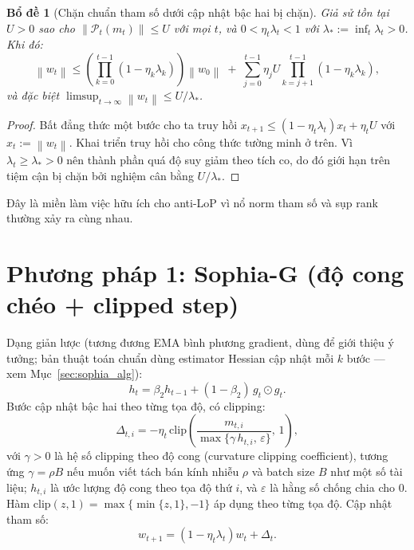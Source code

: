 \documentclass[11pt]{article}
\newcommand{\norm}[1]{\left\lVert #1 \right\rVert}
\newtheorem{lemma}{Bổ đề}[section]
\begin{document}
\begin{lemma}[Chặn chuẩn tham số dưới cập nhật bậc hai bị chặn]
Giả sử tồn tại $U>0$ sao cho $\norm{\mathcal{P}_t(m_t)}\le U$ với mọi $t$, và
$0<\eta_t\lambda_t<1$ với $\lambda_*:=\inf_t \lambda_t>0$. Khi đó:
\begin{equation}
\norm{w_t}
\le
\left(\prod_{k=0}^{t-1}(1-\eta_k\lambda_k)\right)\norm{w_0}
\;+\;
\sum_{j=0}^{t-1}\eta_j U\prod_{k=j+1}^{t-1}(1-\eta_k\lambda_k),
\end{equation}
và đặc biệt $\limsup_{t\to\infty}\norm{w_t}\le U/\lambda_*$.
\end{lemma}

\begin{proof}
Bất đẳng thức một bước cho ta truy hồi
$x_{t+1}\le (1-\eta_t\lambda_t)x_t+\eta_tU$ với $x_t:=\norm{w_t}$.
Khai triển truy hồi cho công thức tường minh ở trên. Vì $\lambda_t\ge\lambda_*>0$ nên thành phần quá độ suy giảm theo tích co,
do đó giới hạn trên tiệm cận bị chặn bởi nghiệm cân bằng $U/\lambda_*$.
\end{proof}

Đây là miền làm việc hữu ích cho anti-LoP vì nổ norm tham số và sụp rank thường xảy ra cùng nhau.

\section{Phương pháp 1: Sophia-G (độ cong chéo + clipped step)}
Dạng giản lược (tương đương EMA bình phương gradient, dùng để giới thiệu ý tưởng;
bản thuật toán chuẩn dùng estimator Hessian cập nhật mỗi $k$ bước --- xem Mục~\ref{sec:sophia_alg}):
\begin{equation}
h_t = \beta_2 h_{t-1} + (1-\beta_2)\, g_t\odot g_t.
\end{equation}
Bước cập nhật bậc hai theo từng tọa độ, có clipping:
\begin{equation}
\Delta_{t,i} = -\eta_t\,\mathrm{clip}\!\left(\frac{m_{t,i}}{\max\{\gamma\,h_{t,i},\,\varepsilon\}},\,1\right),
\end{equation}
với $\gamma>0$ là hệ số clipping theo độ cong (curvature clipping coefficient),
tương ứng $\gamma=\rho B$ nếu muốn viết tách bán kính nhiễu $\rho$ và batch size $B$ như một số tài liệu;
$h_{t,i}$ là ước lượng độ cong theo tọa độ thứ $i$, và $\varepsilon$ là hằng số chống chia cho 0.
Hàm $\mathrm{clip}(z,1)=\max\{\min\{z,1\},-1\}$ áp dụng theo từng tọa độ.
Cập nhật tham số:
\begin{equation}
w_{t+1} = (1-\eta_t\lambda_t)w_t + \Delta_t.
\end{equation}
\end{document}
